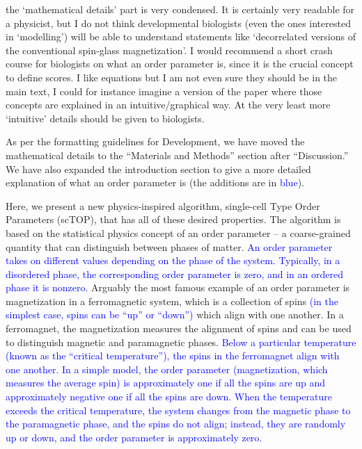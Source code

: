 \documentclass[12pt,american]{scrartcl}
\begin{document}
\begin{revcomment}
    the ‘mathematical details’ part is very condensed. It is certainly 
very readable for a physicist, but I do not think developmental 
biologists (even the ones interested in ‘modelling’) will be able to 
understand statements like ‘decorrelated versions of the conventional 
spin-glass magnetization’. I would recommend a short crash course for 
biologists on what an order parameter is, since it is the crucial 
concept to define scores. I like equations but I am not even sure they 
should be in the main text, I could for instance imagine a version of 
the paper where those concepts are explained in an intuitive/graphical 
way. At the very least more ‘intuitive’ details should be given to 
biologists.
\end{revcomment}
\begin{revresponse}
    As per the formatting guidelines for Development, we have moved the mathematical details to the ``Materials and Methods'' section after ``Discussion.'' We have also expanded the introduction section to give a more detailed explanation of what an order parameter is (the additions are in \textcolor{blue}{blue}).

    \begin{changes}
        Here, we present a new physics-inspired algorithm, single-cell Type Order Parameters (scTOP), that has all of these desired properties. The algorithm is based on the statistical physics concept of an order parameter -- a coarse-grained quantity that can distinguish between phases of matter. \textcolor{blue}{An order parameter takes on different values depending on the phase of the system. Typically, in a disordered phase, the corresponding order parameter is zero, and in an ordered phase it is nonzero.} Arguably the most famous example of an order parameter is magnetization in a ferromagnetic system, which is a collection of spins \textcolor{blue}{(in the simplest case, spins can be ``up'' or ``down'')} which align with one another. In a ferromagnet, the magnetization measures the alignment of spins and can be used to distinguish magnetic and paramagnetic phases. \textcolor{blue}{Below a particular temperature (known as the ``critical temperature''), the spins in the ferromagnet align with one another. In a simple model, the order parameter (magnetization, which measures the average spin) is approximately one if all the spins are up and approximately negative one if all the spins are down. When the temperature exceeds the critical temperature, the system changes from the magnetic phase to the paramagnetic phase, and the spins do not align; instead, they are randomly up or down, and the order parameter is approximately zero.}


\end{changes}
\end{revresponse}
\end{document}
